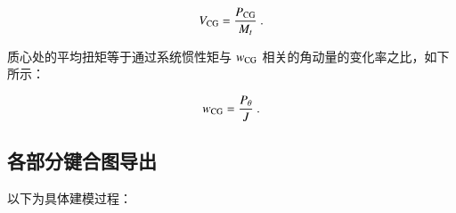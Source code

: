	\begin{equation}
	\label{equ:V_CG}
	V_{\rm{CG}}
	=
	\frac{P_{\rm{CG}}}{M_t}
	\ .
	\end{equation}
	
	质心处的平均扭矩等于通过系统惯性矩与 $ w_{\rm{CG}} $ 相关的角动量的变化率之比，如下所示：
	
	\begin{equation}
	\label{equ:w_CG}
	w_{\rm{CG}}
	=
	\frac{P_{\theta}}{J}
	\ .
	\end{equation}

\subsection{各部分键合图导出}

	以下为具体建模过程：
	
